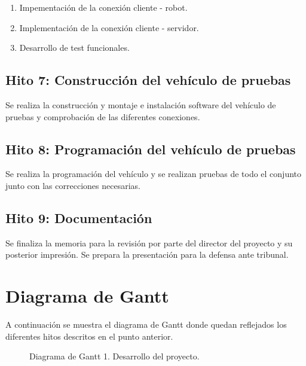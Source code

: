 \begin{enumerate}
\begin{enumerate}
 \item Impementación de la conexión cliente - robot.
 \item Implementación de la conexión cliente - servidor.
 \item Desarrollo de test funcionales.
\end{enumerate}


\subsection{Hito 7: Construcción del vehículo de pruebas }
\label{subsec:hito6}

Se realiza la construcción y montaje e instalación software del vehículo de pruebas y comprobación de las diferentes conexiones.

\subsection{Hito 8: Programación del vehículo de pruebas }
\label{subsec:hito6}

Se realiza la programación del vehículo y se realizan pruebas de todo el conjunto junto con las correcciones necesarias.


\subsection{Hito 9: Documentación }
\label{subsec:hito6}

Se finaliza la memoria para la revisión por parte del director del proyecto y su posterior impresión. Se prepara la presentación para la defensa ante tribunal.


\section{Diagrama de Gantt}

A continuación se muestra el diagrama de Gantt donde quedan reflejados los diferentes hitos descritos en el punto anterior.

\begin{figure}
  \caption{Diagrama de Gantt 1. Desarrollo del proyecto.}
\end{figure}


\end{enumerate}

